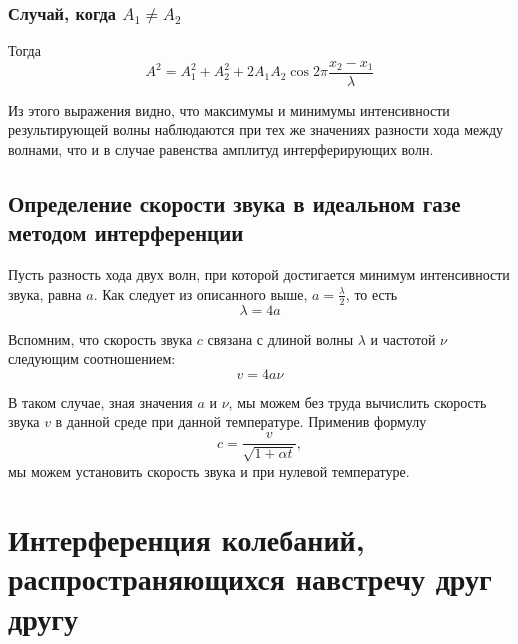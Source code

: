 \documentclass[referat,times]{SCWorks}
\begin{document}
\subsubsection{Случай, когда $A_1 \neq A_2$}
\par Тогда
\begin{equation}
    A^2 = A_1^2 + A_2^2 + 2A_1 A_2 \cos{2\pi \frac{x_2 - x_1}{\lambda}}
\end{equation}
\par Из этого выражения видно, что максимумы и минимумы интенсивности результирующей волны наблюдаются при тех же значениях разности хода между волнами, что и в случае равенства амплитуд интерферирующих волн.
\subsection{Определение скорости звука в идеальном газе методом интерференции}
\par Пусть разность хода двух волн, при которой достигается минимум интенсивности звука, равна $a$. Как следует из описанного выше, $a = \frac \lambda 2$, то есть
\begin{equation}
    \lambda = 4 a
\end{equation}
\par Вспомним, что скорость звука $c$ связана с длиной волны $\lambda$ и частотой $\nu$ следующим соотношением:
\begin{equation}
    v = 4 a \nu
\end{equation}
\par В таком случае, зная значения $a$ и $\nu$, мы можем без труда вычислить скорость звука $v$ в данной среде при данной температуре. Применив формулу
\begin{equation}
    c = \frac{v}{\sqrt{1 + \alpha t}},
\end{equation} мы можем установить скорость звука и при нулевой температуре.

\section{Интерференция колебаний, распространяющихся навстречу друг другу}
\end{document}
